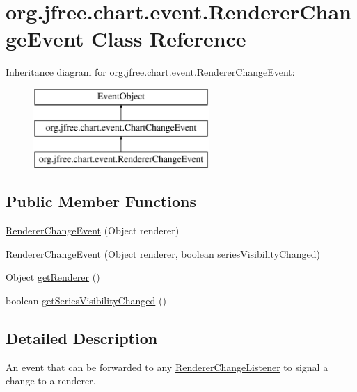 \hypertarget{classorg_1_1jfree_1_1chart_1_1event_1_1_renderer_change_event}{}\section{org.\+jfree.\+chart.\+event.\+Renderer\+Change\+Event Class Reference}
\label{classorg_1_1jfree_1_1chart_1_1event_1_1_renderer_change_event}
Inheritance diagram for org.\+jfree.\+chart.\+event.\+Renderer\+Change\+Event\+:\begin{figure}[H]
\begin{center}
\leavevmode
\includegraphics[height=3.000000cm]{classorg_1_1jfree_1_1chart_1_1event_1_1_renderer_change_event}
\end{center}
\end{figure}
\subsection*{Public Member Functions}
\begin{DoxyCompactItemize}
\item 
\mbox{\hyperlink{classorg_1_1jfree_1_1chart_1_1event_1_1_renderer_change_event_a7c1bcd51193725c21a7f7a25c39e7b90}{Renderer\+Change\+Event}} (Object renderer)
\item 
\mbox{\hyperlink{classorg_1_1jfree_1_1chart_1_1event_1_1_renderer_change_event_ac014dacc0bb229b9c4f52dc8551c8ee9}{Renderer\+Change\+Event}} (Object renderer, boolean series\+Visibility\+Changed)
\item 
Object \mbox{\hyperlink{classorg_1_1jfree_1_1chart_1_1event_1_1_renderer_change_event_ac221fd9e3f759ce73211b2b6fe5ff7a8}{get\+Renderer}} ()
\item 
boolean \mbox{\hyperlink{classorg_1_1jfree_1_1chart_1_1event_1_1_renderer_change_event_acfb2eb07319e8959149ac8c64cab03a5}{get\+Series\+Visibility\+Changed}} ()
\end{DoxyCompactItemize}


\subsection{Detailed Description}
An event that can be forwarded to any \mbox{\hyperlink{interfaceorg_1_1jfree_1_1chart_1_1event_1_1_renderer_change_listener}{Renderer\+Change\+Listener}} to signal a change to a renderer. 


